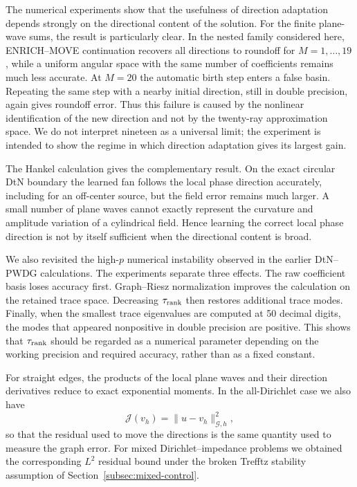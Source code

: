 \documentclass[pdflatex,sn-mathphys-num]{sn-jnl}
\theoremstyle{thmstyleone}
\theoremstyle{thmstyletwo}
\begin{document}
The numerical experiments show that the usefulness of direction adaptation depends strongly on the directional content of the solution.  For the finite plane-wave sums, the result is particularly clear.  In the nested family considered here, ENRICH--MOVE continuation recovers all directions to roundoff for $M=1,\ldots,19$, while a uniform angular space with the same number of coefficients remains much less accurate.  At $M=20$ the automatic birth step enters a false basin.  Repeating the same step with a nearby initial direction, still in double precision, again gives roundoff error.  Thus this failure is caused by the nonlinear identification of the new direction and not by the twenty-ray approximation space.  We do not interpret nineteen as a universal limit; the experiment is intended to show the regime in which direction adaptation gives its largest gain.

The Hankel calculation gives the complementary result.  On the exact circular DtN boundary the learned fan follows the local phase direction accurately, including for an off-center source, but the field error remains much larger.  A small number of plane waves cannot exactly represent the curvature and amplitude variation of a cylindrical field.  Hence learning the correct local phase direction is not by itself sufficient when the directional content is broad.

We also revisited the high-$p$ numerical instability observed in the earlier DtN--PWDG calculations.  The experiments separate three effects.  The raw coefficient basis loses accuracy first.  Graph--Riesz normalization improves the calculation on the retained trace space.  Decreasing $\tau_{\rm rank}$ then restores additional trace modes.  Finally, when the smallest trace eigenvalues are computed at 50 decimal digits, the modes that appeared nonpositive in double precision are positive.  This shows that $\tau_{\rm rank}$ should be regarded as a numerical parameter depending on the working precision and required accuracy, rather than as a fixed constant.

For straight edges, the products of the local plane waves and their direction derivatives reduce to exact exponential moments.  In the all-Dirichlet case we also have
\[
 \mathcal J(v_h)=\|u-v_h\|_{\mathcal G,h}^2,
\]
so that the residual used to move the directions is the same quantity used to measure the graph error.  For mixed Dirichlet--impedance problems we obtained the corresponding $L^2$ residual bound under the broken Trefftz stability assumption of Section~\ref{subsec:mixed-control}.
\end{document}
